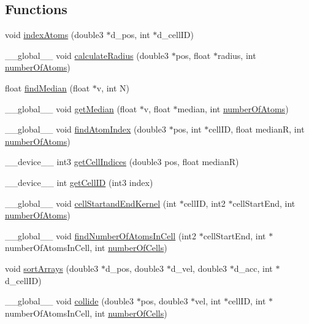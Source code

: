 \subsection*{Functions}
\begin{DoxyCompactItemize}
\item 
void \hyperlink{collisions_8cuh_af197639ca430cb8ebe15f6ca7b6f40ab}{index\+Atoms} (double3 $\ast$d\+\_\+pos, int $\ast$d\+\_\+cell\+I\+D)
\item 
\+\_\+\+\_\+global\+\_\+\+\_\+ void \hyperlink{collisions_8cuh_a5ccf998d9adc2625a01e1438fef20c0c}{calculate\+Radius} (double3 $\ast$pos, float $\ast$radius, int \hyperlink{initial_system_parameters_8cuh_a5ce690e43012981ef3034cbf0c746489}{number\+Of\+Atoms})
\item 
float \hyperlink{collisions_8cuh_ad5d1d3a668210a5440e936d793155b29}{find\+Median} (float $\ast$v, int N)
\item 
\+\_\+\+\_\+global\+\_\+\+\_\+ void \hyperlink{collisions_8cuh_a672fa6a0f8d774696c4644e1fec55e40}{get\+Median} (float $\ast$v, float $\ast$median, int \hyperlink{initial_system_parameters_8cuh_a5ce690e43012981ef3034cbf0c746489}{number\+Of\+Atoms})
\item 
\+\_\+\+\_\+global\+\_\+\+\_\+ void \hyperlink{collisions_8cuh_a58c3c9352a43130c74ebe2f70308fb49}{find\+Atom\+Index} (double3 $\ast$pos, int $\ast$cell\+I\+D, float median\+R, int \hyperlink{initial_system_parameters_8cuh_a5ce690e43012981ef3034cbf0c746489}{number\+Of\+Atoms})
\item 
\+\_\+\+\_\+device\+\_\+\+\_\+ int3 \hyperlink{collisions_8cuh_a695113a00662455ab948335ebd4f5d4d}{get\+Cell\+Indices} (double3 pos, float median\+R)
\item 
\+\_\+\+\_\+device\+\_\+\+\_\+ int \hyperlink{collisions_8cuh_a81f6e38ecb6fb429a8ed20023a87571f}{get\+Cell\+I\+D} (int3 index)
\item 
\+\_\+\+\_\+global\+\_\+\+\_\+ void \hyperlink{collisions_8cuh_aa4ade56a340c2c03dc05ee50cd66e9cb}{cell\+Startand\+End\+Kernel} (int $\ast$cell\+I\+D, int2 $\ast$cell\+Start\+End, int \hyperlink{initial_system_parameters_8cuh_a5ce690e43012981ef3034cbf0c746489}{number\+Of\+Atoms})
\item 
\+\_\+\+\_\+global\+\_\+\+\_\+ void \hyperlink{collisions_8cuh_aa1ebf4327d2fdae4fb65c2d6246af28a}{find\+Number\+Of\+Atoms\+In\+Cell} (int2 $\ast$cell\+Start\+End, int $\ast$number\+Of\+Atoms\+In\+Cell, int \hyperlink{initial_system_parameters_8cuh_ae88ac292f19dd72c295602c5dbb17bd6}{number\+Of\+Cells})
\item 
void \hyperlink{collisions_8cuh_ae795ca12557f5648cfc29a292280591e}{sort\+Arrays} (double3 $\ast$d\+\_\+pos, double3 $\ast$d\+\_\+vel, double3 $\ast$d\+\_\+acc, int $\ast$d\+\_\+cell\+I\+D)
\item 
\+\_\+\+\_\+global\+\_\+\+\_\+ void \hyperlink{collisions_8cuh_a234c8db8e15b25ca114203652185a8af}{collide} (double3 $\ast$pos, double3 $\ast$vel, int $\ast$cell\+I\+D, int $\ast$number\+Of\+Atoms\+In\+Cell, int \hyperlink{initial_system_parameters_8cuh_ae88ac292f19dd72c295602c5dbb17bd6}{number\+Of\+Cells})
\end{DoxyCompactItemize}


